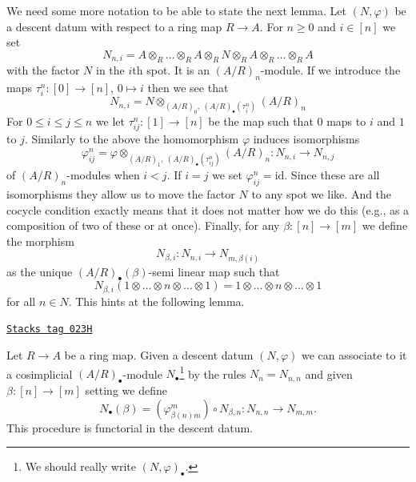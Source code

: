 \medskip\noindent
We need some more notation to be able to state the next lemma.
Let $(N, \varphi)$ be a descent datum with respect to a ring map $R \to A$.
For $n \geq 0$ and $i \in [n]$ we set
$$
N_{n, i} =
A \otimes_R
\ldots
\otimes_R A \otimes_R N \otimes_R A \otimes_R
\ldots
\otimes_R A
$$
with the factor $N$ in the $i$th spot. It is an $(A/R)_n$-module.
If we introduce the maps $\tau^n_i : [0] \to [n]$, $0 \mapsto i$
then we see that
$$
N_{n, i} = N \otimes_{(A/R)_0, \ (A/R)_\bullet(\tau^n_i)} (A/R)_n
$$
For $0 \leq i \leq j \leq n$ we let $\tau^n_{ij} : [1] \to [n]$
be the map such that $0$ maps to $i$ and $1$ to $j$. Similarly
to the above the homomorphism $\varphi$ induces isomorphisms
$$
\varphi^n_{ij}
=
\varphi \otimes_{(A/R)_1, \ (A/R)_\bullet(\tau^n_{ij})} (A/R)_n :
N_{n, i} \longrightarrow N_{n, j}
$$
of $(A/R)_n$-modules when $i < j$. If $i = j$ we set
$\varphi^n_{ij} = \text{id}$. Since these are all isomorphisms they allow us
to move the factor $N$ to any spot we like. And the cocycle condition
exactly means that it does not matter how we do this (e.g., as a composition
of two of these or at once). Finally, for any $\beta : [n] \to [m]$
we define the morphism
$$
N_{\beta, i} : N_{n, i} \to N_{m, \beta(i)}
$$
as the unique $(A/R)_\bullet(\beta)$-semi linear map such that
$$
N_{\beta, i}(1 \otimes \ldots \otimes n \otimes \ldots \otimes 1)
=
1 \otimes \ldots \otimes n \otimes \ldots \otimes 1
$$
for all $n \in N$.
This hints at the following lemma.

\begin{lemma}
\label{descent-lemma-descent-datum-cosimplicial}
\href{https://stacks.math.columbia.edu/tag/023H}{\texttt{Stacks tag 023H}}

Let $R \to A$ be a ring map.
Given a descent datum $(N, \varphi)$ we can associate to it a
cosimplicial $(A/R)_\bullet$-module $N_\bullet$\footnote{We should really
write $(N, \varphi)_\bullet$.} by the
rules $N_n = N_{n, n}$ and given $\beta : [n] \to [m]$
setting we define
$$
N_\bullet(\beta) = (\varphi^m_{\beta(n)m}) \circ N_{\beta, n} :
N_{n, n} \longrightarrow N_{m, m}.
$$
This procedure is functorial in the descent datum.
\end{lemma}

